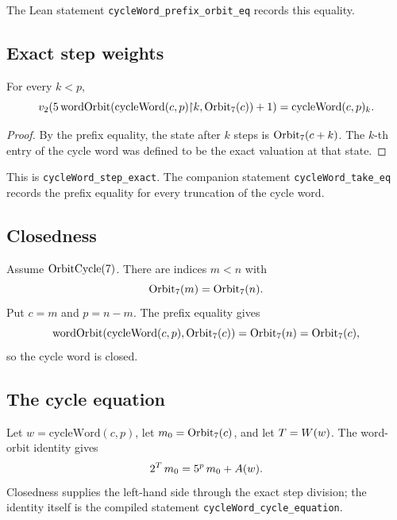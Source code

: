 The Lean statement
\texttt{cycleWord\_\allowbreak prefix\_\allowbreak orbit\_\allowbreak eq}
records this equality.

\subsection{Exact step weights}

\begin{lemma}
For every $k<p$,
\begin{equation*}
  v_2\!\left(5\,\mathrm{wordOrbit}(\mathrm{cycleWord}(c,p){\upharpoonright}k,
  \mathrm{Orbit}_7(c))+1\right)
  =\mathrm{cycleWord}(c,p)_k.
\end{equation*}
\end{lemma}

\begin{proof}
By the prefix equality, the state after $k$ steps is
$\mathrm{Orbit}_7(c+k)$.  The $k$-th entry of the cycle word was defined to be
the exact valuation at that state.
\end{proof}

This is \texttt{cycleWord\_\allowbreak step\_\allowbreak exact}.  The
companion statement \texttt{cycleWord\_\allowbreak take\_\allowbreak eq}
records the prefix equality for every truncation of the cycle word.

\subsection{Closedness}

Assume $\mathrm{OrbitCycle}(7)$.  There are indices $m<n$ with
\begin{equation*}
  \mathrm{Orbit}_7(m)=\mathrm{Orbit}_7(n).
\end{equation*}
Put $c=m$ and $p=n-m$.  The prefix equality gives
\begin{equation*}
  \mathrm{wordOrbit}(\mathrm{cycleWord}(c,p),\mathrm{Orbit}_7(c))=\mathrm{Orbit}_7(n)
  =\mathrm{Orbit}_7(c),
\end{equation*}
so the cycle word is closed.

\subsection{The cycle equation}

Let $w=\mathrm{cycleWord}(c,p)$, let $m_0=\mathrm{Orbit}_7(c)$, and let
$T=W(w)$.  The word-orbit identity gives
\begin{equation*}
  2^T\,m_0=5^p\,m_0+A(w).
\end{equation*}
Closedness supplies the left-hand side through the exact step
division; the identity itself is the compiled statement
\texttt{cycleWord\_\allowbreak cycle\_\allowbreak equation}.


